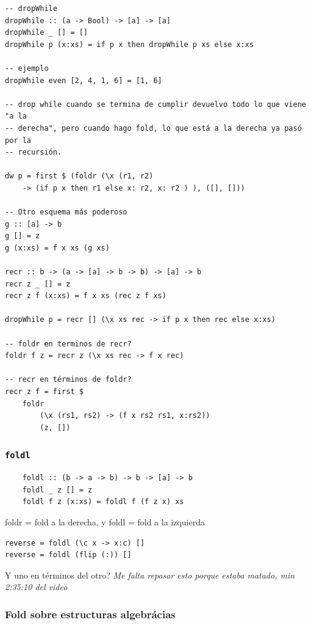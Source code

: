 \documentclass{report}
\theoremstyle{definition} %
\begin{document}
\begin{verbatim}
-- dropWhile
dropWhile :: (a -> Bool) -> [a] -> [a]
dropWhile _ [] = []
dropWhile p (x:xs) = if p x then dropWhile p xs else x:xs

-- ejemplo
dropWhile even [2, 4, 1, 6] = [1, 6]

-- drop while cuando se termina de cumplir devuelvo todo lo que viene "a la
-- derecha", pero cuando hago fold, lo que está a la derecha ya pasó por la
-- recursión.

dw p = first $ (foldr (\x (r1, r2)
    -> (if p x then r1 else x: r2, x: r2 ) ), ([], []))

-- Otro esquema más poderoso
g :: [a] -> b
g [] = z
g (x:xs) = f x xs (g xs)

recr :: b -> (a -> [a] -> b -> b) -> [a] -> b
recr z _ [] = z
recr z f (x:xs) = f x xs (rec z f xs)

dropWhile p = recr [] (\x xs rec -> if p x then rec else x:xs)

-- foldr en terminos de recr?
foldr f z = recr z (\x xs rec -> f x rec)

-- recr en términos de foldr?
recr z f = first $
    foldr
        (\x (rs1, rs2) -> (f x rs2 rs1, x:rs2))
        (z, [])
\end{verbatim}

\subsubsection{\texttt{foldl}}

\begin{verbatim}
    foldl :: (b -> a -> b) -> b -> [a] -> b
    foldl _ z [] = z
    foldl f z (x:xs) = foldl f (f z x) xs
\end{verbatim}

foldr = fold a la derecha, y foldl = fold a la izquierda

\begin{verbatim}
reverse = foldl (\c x -> x:c) []
reverse = foldl (flip (:)) []
\end{verbatim}

Y uno en términos del otro? \textit{Me falta repasar esto porque estaba matado,
min 2:35:10 del video}

\subsubsection{Fold sobre estructuras algebrácias}
\end{document}

